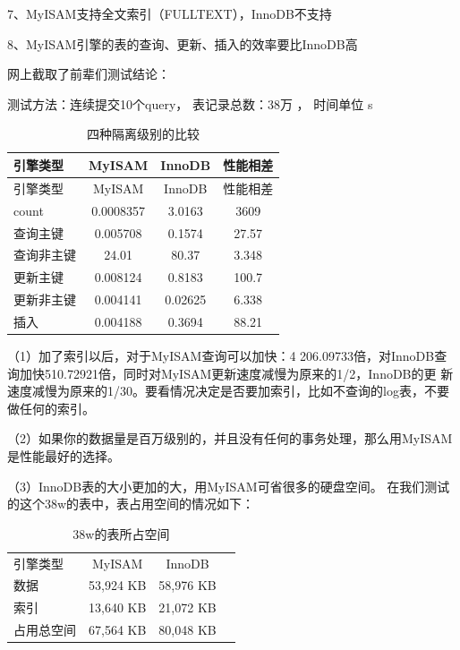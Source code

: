 \documentclass[UTF8]{ctexart}
\begin{document}
7、MyISAM支持全文索引（FULLTEXT），InnoDB不支持

8、MyISAM引擎的表的查询、更新、插入的效率要比InnoDB高

网上截取了前辈们测试结论： 

测试方法：连续提交10个query， 表记录总数：38万 ， 时间单位 s
\begin{table}[]
    \caption{四种隔离级别的比较}
    \vspace{20pt}
    \centering
    \begin{tabular}{|l||c|c|c|}
        \hline
        引擎类型 &MyISAM&InnoDB&性能相差\\
        \hline
        引擎类型              &      MyISAM           &     InnoDB      &        性能相差\\
 
        count                &      0.0008357     &       3.0163      &          3609\\
        查询主键               &   0.005708         &     0.1574        &        27.57\\
 
        查询非主键              &    24.01         &         80.37      &          3.348\\
 
        更新主键                &  0.008124     &      0.8183        &        100.7\\
 
        更新非主键             &   0.004141       &     0.02625        &      6.338\\
 
        插入                    &    0.004188      &      0.3694       &         88.21\\
        \hline       
    \end{tabular}
    \label{bs3}
\end{table}
（1）加了索引以后，对于MyISAM查询可以加快：4 206.09733倍，对InnoDB查询加快510.72921倍，同时对MyISAM更新速度减慢为原来的1/2，InnoDB的更
  新速度减慢为原来的1/30。要看情况决定是否要加索引，比如不查询的log表，不要做任何的索引。
 
 （2）如果你的数据量是百万级别的，并且没有任何的事务处理，那么用MyISAM是性能最好的选择。
 
 （3）InnoDB表的大小更加的大，用MyISAM可省很多的硬盘空间。
        在我们测试的这个38w的表中，表占用空间的情况如下：
   \begin{table}[]
    \caption{38w的表所占空间}
    \vspace{20pt}
    \centering
    \begin{tabular}{|l|c|c|c|}
        \hline
            引擎类型       &             MyISAM     &        InnoDB\\
            数据            &          53,924 KB      &    58,976 KB\\
            索引             &         13,640 KB     &     21,072 KB\\
            占用总空间      &        67,564 KB       &   80,048 KB\\
  
          \hline       
    \end{tabular}
    \label{bs4}
\end{table}
\end{document}
